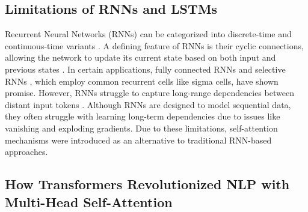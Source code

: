 \subsection{Limitations of RNNs and LSTMs} 

Recurrent Neural Networks (RNNs) can be categorized into discrete-time and continuous-time variants \cite{grossberg2013}. A defining feature of RNNs is their cyclic connections, allowing the network to update its current state based on both input and previous states \cite{salehinejad2017recent}. In certain applications, fully connected RNNs \cite{elman1990} and selective RNNs \cite{ster2013}, which employ common recurrent cells like sigma cells, have shown promise. However, RNNs struggle to capture long-range dependencies between distant input tokens \cite{ster2013}. Although RNNs are designed to model sequential data, they often struggle with learning long-term dependencies due to issues like vanishing and exploding gradients. Due to these limitations, self-attention mechanisms were introduced as an alternative to traditional RNN-based approaches.

\subsection{How Transformers Revolutionized NLP with Multi-Head Self-Attention}

